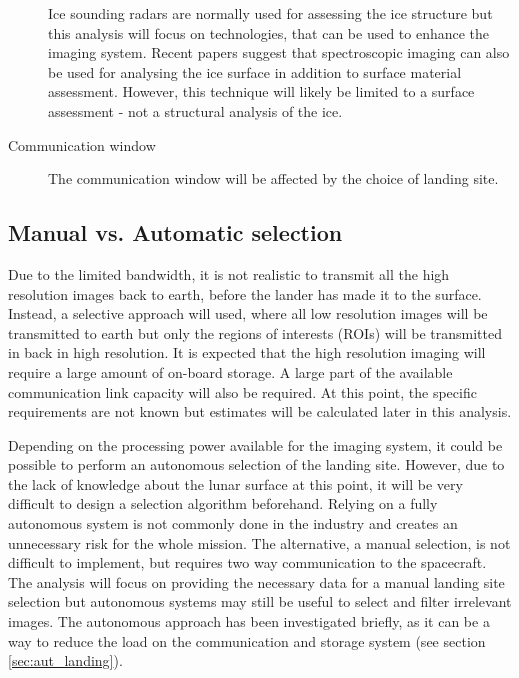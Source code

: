 \begin{description}
    Ice sounding radars are normally used for assessing the ice structure but this analysis will focus on technologies, that can be used to enhance the imaging system. Recent papers suggest that spectroscopic imaging can also be used for analysing the ice surface \cite{naegeli2015a} in addition to surface material assessment. However, this technique will likely be limited to a surface assessment - not a structural analysis of the ice.
    \item[Communication window] The communication window will be affected by the choice of landing site.
\end{description}
\subsection{Manual vs. Automatic selection}
Due to the limited bandwidth, it is not realistic to transmit all the high resolution images back to earth, before the lander has made it to the surface. Instead, a selective approach will used, where all low resolution images will be transmitted to earth but only the regions of interests (ROIs) will be transmitted in back in high resolution. It is expected that the high resolution imaging will require a large amount of on-board storage. A large part of the available communication link capacity will also be required. At this point, the specific requirements are not known but estimates will be calculated later in this analysis.

Depending on the processing power available for the imaging system, it could be possible to perform an autonomous selection of the landing site. However, due to the lack of knowledge about the lunar surface at this point, it will be very difficult to design a selection algorithm beforehand. Relying on a fully autonomous system is not commonly done in the industry and creates an unnecessary risk for the whole mission. The alternative, a manual selection, is not difficult to implement, but requires two way communication to the spacecraft. The analysis will focus on providing the necessary data for a manual landing site selection but autonomous systems may still be useful to select and filter irrelevant images. The autonomous approach has been investigated briefly, as it can be a way to reduce the load on the communication and storage system (see section \ref{sec:aut_landing}).

